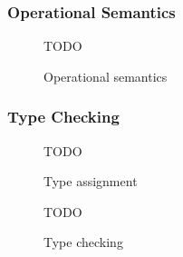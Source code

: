 \subsubsection{Operational Semantics}
\begin{figure}
TODO
\caption{Operational semantics}
\end{figure}

\subsubsection{Type Checking}
\begin{figure}
TODO
\caption{Type assignment}
\end{figure}
\begin{figure}
TODO
\caption{Type checking}
\end{figure}

